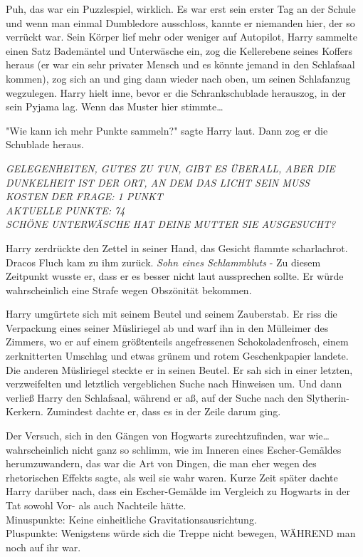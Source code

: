 {Puh, das war ein Puzzlespiel, wirklich. Es war erst sein erster Tag an der Schule und wenn man einmal Dumbledore ausschloss, kannte er niemanden hier, der so verrückt war. Sein Körper lief mehr oder weniger auf Autopilot, Harry sammelte einen Satz Bademäntel und Unterwäsche ein, zog die Kellerebene seines Koffers heraus (er war ein sehr privater Mensch und es könnte jemand in den Schlafsaal kommen), zog sich an und ging dann wieder nach oben, um seinen Schlafanzug wegzulegen. Harry hielt inne, bevor er die Schrankschublade herauszog, in der sein Pyjama lag. Wenn das Muster hier stimmte…

"Wie kann ich mehr Punkte sammeln?" sagte Harry laut. Dann zog er die Schublade heraus.

\emph{GELEGENHEITEN, GUTES ZU TUN, GIBT ES ÜBERALL, ABER DIE DUNKELHEIT IST DER ORT, AN DEM DAS LICHT SEIN MUSS}\\ \emph{KOSTEN DER FRAGE: 1 PUNKT}\\ \emph{AKTUELLE PUNKTE: 74}\\ \emph{SCHÖNE UNTERWÄSCHE HAT DEINE MUTTER SIE AUSGESUCHT?}

Harry zerdrückte den Zettel in seiner Hand, das Gesicht flammte scharlachrot. Dracos Fluch kam zu ihm zurück. \emph{Sohn eines Schlammbluts} - Zu diesem Zeitpunkt wusste er, dass er es besser nicht laut aussprechen sollte. Er würde wahrscheinlich eine Strafe wegen Obszönität bekommen.

Harry umgürtete sich mit seinem Beutel und seinem Zauberstab. Er riss die Verpackung eines seiner Müsliriegel ab und warf ihn in den Mülleimer des Zimmers, wo er auf einem größtenteils angefressenen Schokoladenfrosch, einem zerknitterten Umschlag und etwas grünem und rotem Geschenkpapier landete. Die anderen Müsliriegel steckte er in seinen Beutel. Er sah sich in einer letzten, verzweifelten und letztlich vergeblichen Suche nach Hinweisen um. Und dann verließ Harry den Schlafsaal, während er aß, auf der Suche nach den Slytherin-Kerkern. Zumindest dachte er, dass es in der Zeile darum ging.

Der Versuch, sich in den Gängen von Hogwarts zurechtzufinden, war wie… wahrscheinlich nicht ganz so schlimm, wie im Inneren eines Escher-Gemäldes herumzuwandern, das war die Art von Dingen, die man eher wegen des rhetorischen Effekts sagte, als weil sie wahr waren. Kurze Zeit später dachte Harry darüber nach, dass ein Escher-Gemälde im Vergleich zu Hogwarts in der Tat sowohl Vor- als auch Nachteile hätte.\\ Minuspunkte: Keine einheitliche Gravitationsausrichtung.\\ Pluspunkte: Wenigstens würde sich die Treppe nicht bewegen, WÄHREND man noch auf ihr war.

}
